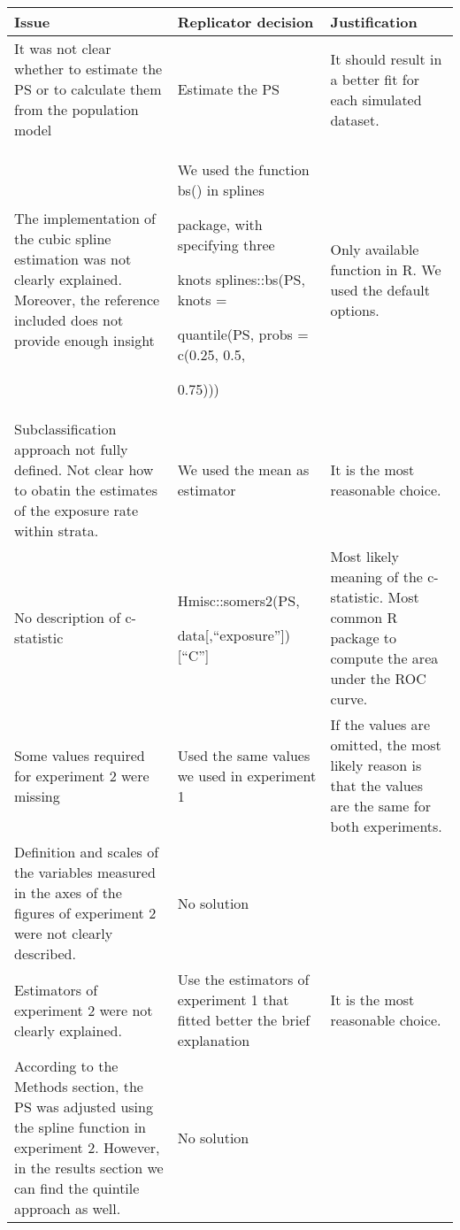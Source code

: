 \documentclass[10,a4paperpaper,]{article}
\begin{document}
\begin{longtable}[]{@{}
  >{\raggedright\arraybackslash}p{}
  >{\raggedright\arraybackslash}p{}
  >{\raggedright\arraybackslash}p{}@{}}
\toprule
Issue & Replicator decision & Justification \\
\midrule
\endhead
It was not clear whether to estimate the PS or to calculate them from
the population model & Estimate the PS & It should result in a better
fit for each simulated dataset. \\
The implementation of the cubic spline estimation was not clearly
explained. Moreover, the reference included does not provide enough
insight & We used the function bs() in splines

package, with specifying three

knots splines::bs(PS, knots =

quantile(PS, probs = c(0.25, 0.5,

0.75))) & Only available function in R. We used the default options. \\
Subclassification approach not fully defined. Not clear how to obatin
the estimates of the exposure rate within strata. & We used the mean as
estimator & It is the most reasonable choice. \\
No description of c-statistic & Hmisc::somers2(PS,

data{[},``exposure''{]}){[}``C''{]} & Most likely meaning of the
c-statistic. Most common R package to compute the area under the ROC
curve. \\
Some values required for experiment 2 were missing & Used the same
values we used in experiment 1 & If the values are omitted, the most
likely reason is that the values are the same for both experiments. \\
Definition and scales of the variables measured in the axes of the
figures of experiment 2 were not clearly described. & No solution & \\
Estimators of experiment 2 were not clearly explained. & Use the
estimators of experiment 1 that fitted better the brief explanation & It
is the most reasonable choice. \\
According to the Methods section, the PS was adjusted using the spline
function in experiment 2. However, in the results section we can find
the quintile approach as well. & No solution & \\
\bottomrule
\end{longtable}
\end{document}
